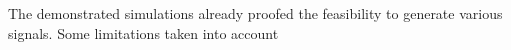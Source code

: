 The demonstrated simulations already proofed the feasibility to generate various signals.
Some limitations taken into account 










